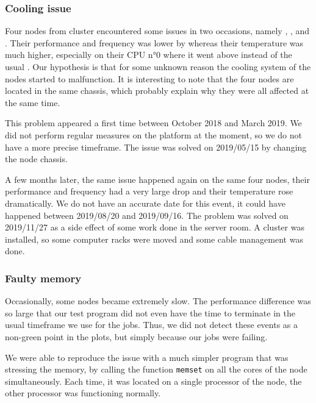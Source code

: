             \subsubsection{Cooling issue}%

                Four nodes from cluster \dahu encountered some issues in two occasions, namely ,
                ,  and . Their performance and frequency was lower by
                 whereas their temperature was much higher, especially on their CPU n°0 where it went
                above  instead of the usual . Our hypothesis is that for some
                unknown reason the cooling system of the nodes started to malfunction. It is interesting to note that
                the four nodes are located in the same chassis, which probably explain why they were all affected at the
                same time.

                This problem appeared a first time between October 2018 and March 2019. We did not perform regular
                measures on the platform at the moment, so we do not have a more precise timeframe. The issue was solved
                on 2019/05/15 by changing the node chassis.

                A few months later, the same issue happened again on the same four nodes, their performance and
                frequency had a very large drop and their temperature rose dramatically. We do not have an accurate date
                for this event, it could have happened between 2019/08/20 and 2019/09/16. The problem was solved on
                2019/11/27 as a side effect of some work done in the server room. A cluster was installed, so some
                computer racks were moved and some cable management was done.

            \subsubsection{Faulty memory}%

                Occasionally, some nodes became extremely slow. The performance difference was so large that our test
                program did not even have the time to terminate in the usual timeframe we use for the jobs. Thus, we
                did not detect these events as a non-green point in the plots, but simply because our jobs were failing.

                We were able to reproduce the issue with a much simpler program that was stressing the memory, by
                calling the function \texttt{memset} on all the cores of the node simultaneously. Each time, it was
                located on a single processor of the node, the other processor was functioning normally.

